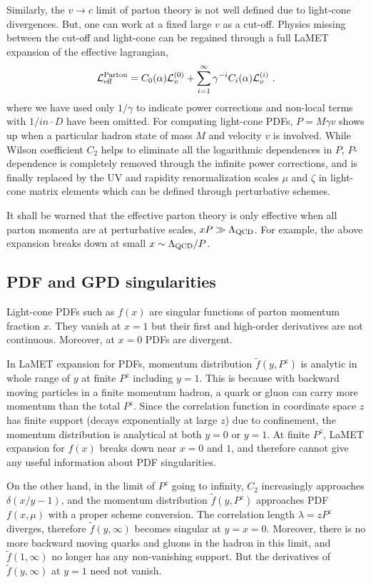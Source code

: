 \documentclass[prd,aps,twocolumn,preprintnumbers,showpacs,nofootinbib,superscriptaddress,notitlepage]{revtex4-1}
\begin{document}
Similarly, the $v\to c$ limit of parton theory is not well defined due to light-cone divergences.  But, one can work at a fixed large $v$ as a cut-off. Physics missing between the cut-off and light-cone can be regained through a full LaMET expansion of the effective lagrangian, 
\begin{equation}
  {\cal L}_{\rm eff}^{\rm Parton} = C_0(\alpha){\cal L}^{(0)}_v + \sum_{i=1}^\infty \gamma^{-i} C_i(\alpha){\cal L}^{(i)}_v \ .     
\end{equation}
where we have used only $1/\gamma$ to indicate power corrections and non-local terms with $1/in\cdot D$ have been omitted. For computing light-cone PDFs, $P =M\gamma v$ shows up when a particular hadron state of mass $M$ and velocity $v$ is involved. While Wilson coefficient $C_2$ helps to eliminate all the logarithmic dependences in $P$, $P$-dependence is completely removed through the infinite power corrections, and is finally replaced by the UV 
and rapidity renormalization scales $\mu$ and $\zeta$ in light-cone matrix elements which can be defined through perturbative schemes.

It shall be warned that the effective parton theory is only effective when all parton momenta are at perturbative scales, $xP\gg\Lambda_{\rm QCD}$. For example, the above expansion breaks down at small $x\sim \Lambda_{\rm QCD}/P$.  

\subsection{PDF and GPD singularities}

Light-cone PDFs such as $f(x)$ are singular functions of parton momentum fraction $x$. They vanish at $x=1$ but their first and high-order derivatives are not continuous. Moreover, at $x=0$ PDFs are divergent. 

In LaMET expansion for PDFs, momentum distribution $\tilde f(y, P^z)$ is analytic in whole range of $y$ at finite $P^z$ including $y=1$. This is because with backward moving particles in a finite momentum hadron, a quark or gluon can carry more momentum than the total $P^z$. Since the correlation function in coordinate space $z$ has finite support (decays exponentially at
large $z$) due to confinement, the momentum distribution is analytical at both $y=0$ or $y=1$. At finite $P^z$, LaMET expansion for $f(x)$ breaks down near $x=0$ and $1$, and therefore cannot give any useful information about PDF singularities. 

On the other hand, in the limit of $P^z$ going to infinity, $C_2$ increasingly approaches $\delta(x/y-1)$,  and the momentum distribution $\tilde f(y, P^z)$ approaches PDF $f(x, \mu)$ with a proper scheme conversion.  The correlation length $\lambda = zP^z$ diverges, therefore $\tilde f(y,\infty)$ becomes singular at $y=x=0$. Moreover, there is no more backward moving quarks and gluons in the hadron in this limit, and  $\tilde f(1, \infty)$ no longer has any non-vanishing support. But the derivatives of $\tilde f(y, \infty)$ at $y=1$ need not vanish. 
\end{document}
